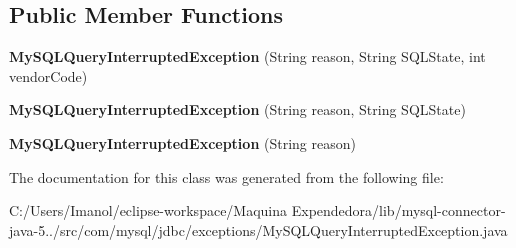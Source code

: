 \subsection*{Public Member Functions}
\begin{DoxyCompactItemize}
\item 
\mbox{\label{classcom_1_1mysql_1_1jdbc_1_1exceptions_1_1_my_s_q_l_query_interrupted_exception_aefc19188607b0a4979403a6287e5ee86}} 
{\bfseries My\+S\+Q\+L\+Query\+Interrupted\+Exception} (String reason, String S\+Q\+L\+State, int vendor\+Code)
\item 
\mbox{\label{classcom_1_1mysql_1_1jdbc_1_1exceptions_1_1_my_s_q_l_query_interrupted_exception_a50e73bbaaafef9dd4aa8f220aff6b5ec}} 
{\bfseries My\+S\+Q\+L\+Query\+Interrupted\+Exception} (String reason, String S\+Q\+L\+State)
\item 
\mbox{\label{classcom_1_1mysql_1_1jdbc_1_1exceptions_1_1_my_s_q_l_query_interrupted_exception_aefbbad17daa88e3000ad7c030b0ad681}} 
{\bfseries My\+S\+Q\+L\+Query\+Interrupted\+Exception} (String reason)
\end{DoxyCompactItemize}


The documentation for this class was generated from the following file\+:\begin{DoxyCompactItemize}
\item 
C\+:/\+Users/\+Imanol/eclipse-\/workspace/\+Maquina Expendedora/lib/mysql-\/connector-\/java-\/5../src/com/mysql/jdbc/exceptions/My\+S\+Q\+L\+Query\+Interrupted\+Exception.\+java\end{DoxyCompactItemize}
